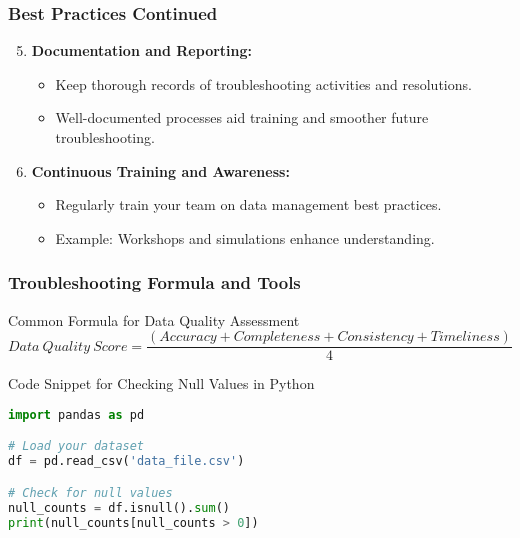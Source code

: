 \documentclass{beamer}
\begin{document}
\begin{frame}[fragile]
    \frametitle{Best Practices Continued}
    
    \begin{enumerate}
        \setcounter{enumi}{4}
        \item \textbf{Documentation and Reporting:}
        \begin{itemize}
            \item Keep thorough records of troubleshooting activities and resolutions.
            \item Well-documented processes aid training and smoother future troubleshooting.
        \end{itemize}

        \item \textbf{Continuous Training and Awareness:}
        \begin{itemize}
            \item Regularly train your team on data management best practices.
            \item Example: Workshops and simulations enhance understanding.
        \end{itemize}
    \end{enumerate}
\end{frame}

\begin{frame}[fragile]
    \frametitle{Troubleshooting Formula and Tools}

    \begin{block}{Common Formula for Data Quality Assessment}
        \[
        Data\ Quality\ Score = \frac{(Accuracy + Completeness + Consistency + Timeliness)}{4}
        \]
    \end{block}

    \begin{block}{Code Snippet for Checking Null Values in Python}
        \begin{lstlisting}[language=Python]
import pandas as pd

# Load your dataset
df = pd.read_csv('data_file.csv')

# Check for null values
null_counts = df.isnull().sum()
print(null_counts[null_counts > 0])
        \end{lstlisting}
    \end{block}
\end{frame}
\end{document}
